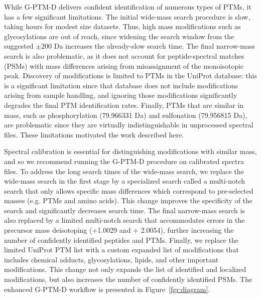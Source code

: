 \documentclass[journal=jprobs,manuscript=article]{achemso}
\begin{document}
While G-PTM-D delivers confident identification of numerous types of PTMs, it has a few significant limitations.
The initial wide-mass search procedure is slow, taking hours for modest size datasets.
Thus, high mass modifications such as glycosylations are out of reach, since widening the search window from the suggested $\pm 200$ Da increases the already-slow search time.
The final narrow-mass search is also problematic, as it does not account for peptide-spectral matches (PSMs) with mass differences arising from misassignment of the monoisotopic peak.
Discovery of modifications is limited to PTMs in the UniProt database: this is a significant limitation since that database does not include modifications arising from sample handling, and ignoring those modifications significantly degrades the final PTM identification rates.
Finally, PTMs that are similar in mass, such as phosphorylation (79.966331 Da) and sulfonation (79.956815 Da), are problematic since they are virtually indistinguishable in unprocessed spectral files.
These limitations motivated the work described here.

Spectral calibration is essential for distinguishing modifications with similar mass, and so we recommend running the G-PTM-D procedure on calibrated spectra files.
To address the long search times of the wide-mass search, we replace the wide-mass search in the first stage by a specialized search called a multi-notch search that only allows specific mass differences which correspond to pre-selected masses (e.g. PTMs and amino acids).
This change improves the specificity of the search and significantly decreases search time.
The final narrow-mass search is also replaced by a limited multi-notch search that accommodates errors in the precursor mass deisotoping (+1.0029 and + 2.0054), further increasing the number of confidently identified peptides and PTMs.
Finally, we replace the limited UniProt PTM list with a custom expanded list of modifications that includes chemical adducts, glycosylations, lipids, and other important modifications.
This change not only expands the list of identified and localized modifications, but also increases the number of confidently identified PSMs.
The enhanced G-PTM-D workflow is presented in Figure~\ref{fgr:diagram}.
\end{document}

